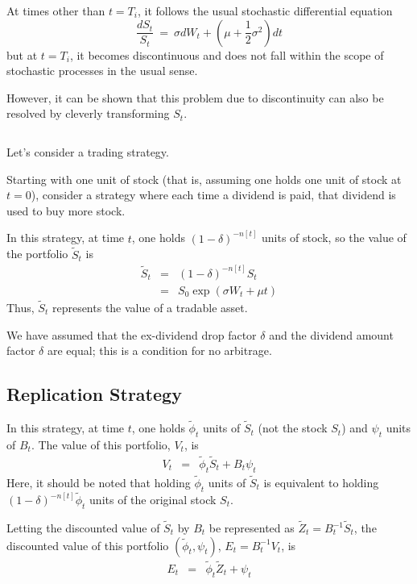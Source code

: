 \documentclass[uplatex,a4j,12pt,dvipdfmx]{jsarticle}
\begin{document}
At times other than $t=T_{i}$, it follows the usual stochastic differential equation
$$
	\dfrac{dS_{t}}{S_{t}}
	\ = \
	\sigma d W_{t}
	+
	\left( \mu + \dfrac{1}{2} \sigma^{2} \right)
	dt
$$
but at $t=T_{i}$, it becomes discontinuous and does not fall within the scope of stochastic processes in the usual sense.

However, it can be shown that this problem due to discontinuity can also be resolved by cleverly transforming $S_{t}$.

${}$

Let's consider a trading strategy.

Starting with one unit of stock (that is, assuming one holds one unit of stock at $t=0$), consider a strategy where each time a dividend is paid, that dividend is used to buy more stock.

In this strategy, at time $t$, one holds $(1-\delta)^{-n[t]}$ units of stock, so the value of the portfolio $\tilde{S}_{t}$ is
%
%
\begin{eqnarray*}
	\tilde{S}_{t}
	&=&
	(1-\delta)^{-n[t]} S_{t}
	\\ &=&
	S_{0}
	\exp(\sigma W_{t} + \mu t)
\end{eqnarray*}
%
%
Thus, $\tilde{S}_{t}$ represents the value of a tradable asset.

We have assumed that the ex-dividend drop factor $\delta$ and the dividend amount factor $\delta$ are equal; this is a condition for no arbitrage.
\subsection{Replication Strategy}

In this strategy, at time $t$, one holds $\tilde{\phi}_{t}$ units of $\tilde{S}_{t}$ (not the stock $S_{t}$) and $\psi_{t}$ units of $B_{t}$.
The value of this portfolio, $V_{t}$, is
%
%
\begin{eqnarray*}
	V_{t}
	&=&
	\tilde{\phi}_{t} \tilde{S}_{t} + B_{t} \psi_{t}
\end{eqnarray*}
%
%
Here, it should be noted that holding $\tilde{\phi}_{t}$ units of $\tilde{S}_{t}$ is equivalent to holding $(1-\delta)^{-n[t]} \tilde{\phi}_{t}$ units of the original stock $S_{t}$.

Letting the discounted value of $\tilde{S}_{t}$ by $B_{t}$ be represented as $\tilde{Z}_{t} = B^{-1}_{t} \tilde{S}_{t}$, the discounted value of this portfolio $(\tilde{\phi}_{t},\psi_{t})$, $E_{t}=B^{-1}_{t} V_{t}$, is
%
%
\begin{eqnarray*}
	E_{t}
	&=&
	\tilde{\phi}_{t} \tilde{Z}_{t} + \psi_{t}
\end{eqnarray*}
%
%
\end{document}
